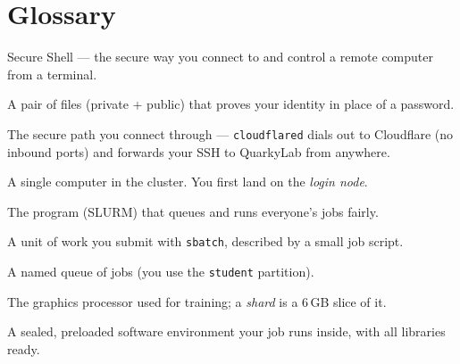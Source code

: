 \documentclass[11pt]{article}
\newcommand{\LabName}{QuarkyLab}                       %
\newcommand{\ShardMem}{6\,GB}                          %
\newcommand{\code}[1]{\texttt{#1}}
\begin{document}
\section{Glossary}
\begin{description}[leftmargin=!,labelwidth=3.2cm,itemsep=3pt]
  \item[SSH] Secure Shell --- the secure way you connect to and control a remote computer from a terminal.
  \item[SSH key] A pair of files (private + public) that proves your identity in place of a password.
  \item[Cloudflare Tunnel] The secure path you connect through --- \code{cloudflared} dials out to Cloudflare (no inbound ports) and forwards your SSH to \LabName{} from anywhere.
  \item[Node] A single computer in the cluster. You first land on the \emph{login node}.
  \item[Scheduler] The program (SLURM) that queues and runs everyone's jobs fairly.
  \item[Job] A unit of work you submit with \code{sbatch}, described by a small job script.
  \item[Partition] A named queue of jobs (you use the \code{student} partition).
  \item[GPU / shard] The graphics processor used for training; a \emph{shard} is a \ShardMem{} slice of it.
  \item[Container] A sealed, preloaded software environment your job runs inside, with all libraries ready.
\end{description}
\end{document}
